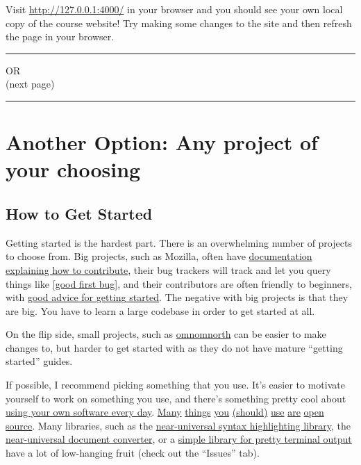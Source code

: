 \documentclass{article}
\begin{document}
Visit \url{http://127.0.0.1:4000/} in your browser and you should see your own
local copy of the course website! Try making some changes to the site and then
refresh the page in your browser.

\bigskip
\bigskip
\bigskip
\bigskip

{\centering
  \hrule
\bigskip
  \LARGE OR \\
  \Large (next page)
\bigskip
  \hrule
}


\newpage

\section*{Another Option: Any project of your choosing}


\subsection*{How to Get Started}

Getting started is the hardest part. There is an overwhelming number of
projects to choose from.
Big projects, such as Mozilla, often have
\href{https://developer.mozilla.org/en-US/docs/Introduction}
{documentation explaining how to contribute},
their bug trackers will track and let you query things like
\href{https://bugzilla.mozilla.org/buglist.cgi?resolution=---&classification=Client%20Software&emailtype1=regexp&status_whiteboard_type=allwordssubstr&query_format=advanced&emailassigned_to1=1&status_whiteboard=%5Bgood%20first%20bug%5D&email1=nobody}
{[good first bug]},
and their contributors are often friendly to beginners, with
\href{https://bugzilla.mozilla.org/show_bug.cgi?id=361983#c11}
{good advice for getting started}.
The negative with big projects is that they are big. You have to learn a large
codebase in order to get started at all.

On the flip side, small projects, such as
\href{https://github.com/kylelady/omnomnorth}{omnomnorth}
can be easier to make changes to, but harder to get started with as they do
not have mature ``getting started'' guides.

If possible, I recommend picking something that you use. It's easier to
motivate yourself to work on something you use, and there's something pretty
cool about \href{https://github.com/um-cseg/chez-betty/}{using your own
software every day}.
\href{https://github.com/Aluxian/Facebook-Messenger-Desktop}{Many}
\href{https://github.com/GNOME/gnome-terminal}{things}
\href{https://github.com/gnachman/iTerm2}{you}
\href{https://github.com/tmux/tmux}{(should)}
\href{https://trac.transmissionbt.com/wiki/Building}{use}
\href{https://github.com/scummvm/scummvm}{are}
\href{https://github.com/GNOME/gimp}{open}
\href{https://github.com/videolan/vlc}{source}.
Many libraries, such as the
\href{https://bitbucket.org/birkenfeld/pygments-main}
{near-universal syntax highlighting library}, the
\href{https://github.com/jgm/pandoc}
{near-universal document converter}, or a
\href{https://github.com/tartley/colorama}
{simple library for pretty terminal output}
have a lot of low-hanging fruit (check out the ``Issues'' tab).
\end{document}
